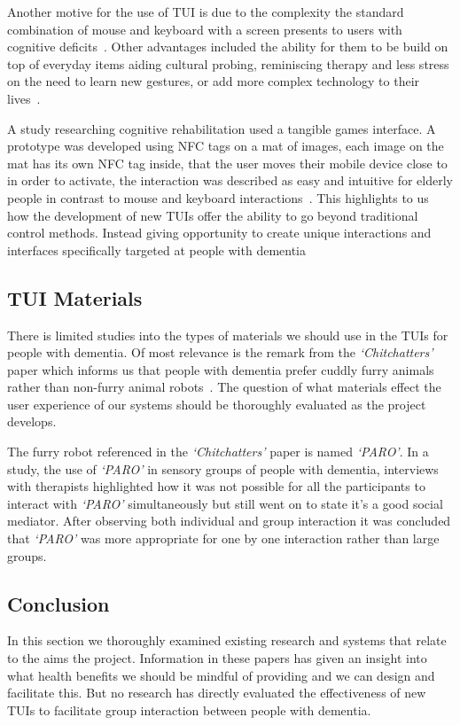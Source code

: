 
Another motive for the use of TUI is due to the complexity the standard combination of mouse and keyboard with a screen presents to users with cognitive deficits~\cite{boussemart2007}.
Other advantages included the ability for them to be build on top of everyday items aiding cultural probing, reminiscing therapy and less stress on the need to learn new gestures, or add more complex technology to their lives~\cite{boussemart2007,Spreicer2012}.

A study researching cognitive rehabilitation used a tangible games interface.
A prototype was developed using NFC tags on a mat of images, each image on the mat has its own NFC tag inside, that the user moves their mobile device close to in order to activate, the interaction was described as easy and intuitive for elderly people in contrast to mouse and keyboard interactions~\cite{Guia2013}. 
This highlights to us how the development of new TUIs offer the ability to go beyond traditional control methods.
Instead giving opportunity to create unique interactions and interfaces specifically targeted at people with dementia

\subsection{TUI Materials}
There is limited studies into the types of materials we should use in the TUIs for people with dementia. Of most relevance is the remark from the \emph{`Chitchatters'} paper which informs us that people with dementia prefer cuddly furry animals rather than non-furry animal robots~\cite{VanRijn2010}. The question of what materials effect the user experience of our systems should be thoroughly evaluated as the project develops. 

The furry robot referenced in the \emph{`Chitchatters'} paper is named \emph{`PARO'}. In a study, the use of \emph{`PARO'} in sensory groups of people with dementia, interviews with therapists highlighted how it was not possible for all the participants to interact with \emph{`PARO'} simultaneously but still went on to state it's a good social mediator. 
After observing both individual and group interaction it was concluded that \emph{`PARO'} was more appropriate for one by one interaction rather than large groups.

\subsection{Conclusion}
In this section we thoroughly examined existing research and systems that relate to the aims the project. 
Information in these papers has given an insight into what health benefits we should be mindful of providing and we can design and facilitate this. 
But no research has directly evaluated the effectiveness of new TUIs to facilitate group interaction between people with dementia.